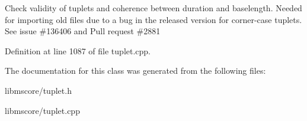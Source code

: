 Check validity of tuplets and coherence between duration and baselength. Needed for importing old files due to a bug in the released version for corner-\/case tuplets. See issue \#136406 and Pull request \#2881 

Definition at line 1087 of file tuplet.\+cpp.



The documentation for this class was generated from the following files\+:\begin{DoxyCompactItemize}
\item 
libmscore/tuplet.\+h\item 
libmscore/tuplet.\+cpp\end{DoxyCompactItemize}
